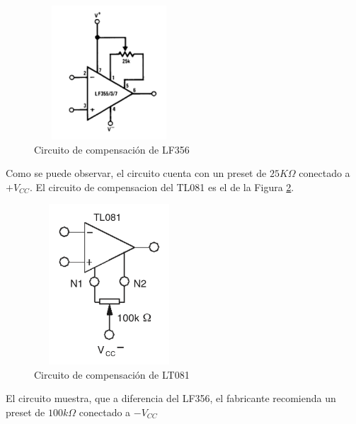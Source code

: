 \documentclass[12pt,a4paper]{article}
\begin{document}
\begin{figure}[ht]                                                       
    \centering\includegraphics[width=0.5\textwidth, height=5cm]{Figuras/fig_6.png}
     \caption{Circuito de compensación de LF356}
     \label{compensacion_LF356}
     \end{figure}

Como se puede observar, el circuito cuenta con un preset de $25K\Omega$ conectado a $+V_{CC}$. El circuito de compensacion del TL081 es el 
de la Figura \ref{compensacion_LT081}.


\begin{figure}[h!]                                                       
    \centering\includegraphics[width=0.5\textwidth, height=6cm]{Figuras/fig_7.png}

    \caption{Circuito de compensación de LT081}
     \label{compensacion_LT081}
     \end{figure}

 

El circuito muestra, que a diferencia del LF356, el fabricante recomienda un preset de $100k\Omega$ conectado a $-V_{CC}$
\end{document}
